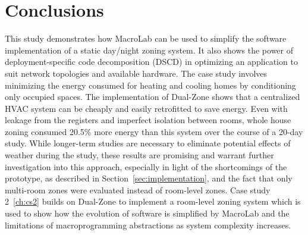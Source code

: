 \section{Conclusions}
\label{sec:conclusions}

This study demonstrates how MacroLab can be used to simplify the software
implementation of a static day/night zoning system. It also shows the power of
deployment-specific code decomposition (DSCD) in optimizing an application to
suit network topologies and available hardware. The case study involves
minimizing the energy consumed for heating and cooling homes by conditioning
only occupied spaces. The implementation of Dual-Zone shows that a
centralized HVAC system can be cheaply and easily retrofitted to save
energy. Even with leakage from the registers and imperfect isolation between
rooms, whole house zoning consumed 20.5\% more energy than this system over the
course of a 20-day study.  While longer-term studies are necessary to eliminate
potential effects of weather during the study, these results are promising and
warrant further investigation into this approach, especially in light of the
shortcomings of the prototype, as described in Section~\ref{sec:implementation},
and the fact that only multi-room zones were evaluated instead of room-level
zones. Case study 2~\ref{ch:cs2} builds on Dual-Zone to implement a
room-level zoning system which is used to show how the evolution of software is
simplified by MacroLab and the limitations of macroprogramming abstractions as
system complexity increases.
